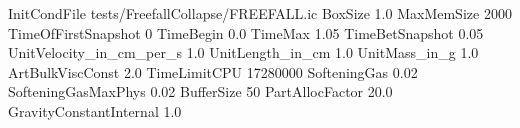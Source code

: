 InitCondFile    tests/FreefallCollapse/FREEFALL.ic
BoxSize    1.0
MaxMemSize    2000
TimeOfFirstSnapshot    0
TimeBegin    0.0
TimeMax    1.05
TimeBetSnapshot    0.05
UnitVelocity_in_cm_per_s    1.0
UnitLength_in_cm    1.0
UnitMass_in_g    1.0
ArtBulkViscConst    2.0
TimeLimitCPU    17280000
SofteningGas    0.02
SofteningGasMaxPhys    0.02
BufferSize    50
PartAllocFactor    20.0
GravityConstantInternal    1.0
